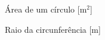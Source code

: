 \begin{simbolos}
  \item[$A$] Área de um círculo [$\text{m}^2$]
  \item[$r$] Raio da circunferência [m]
\end{simbolos}
